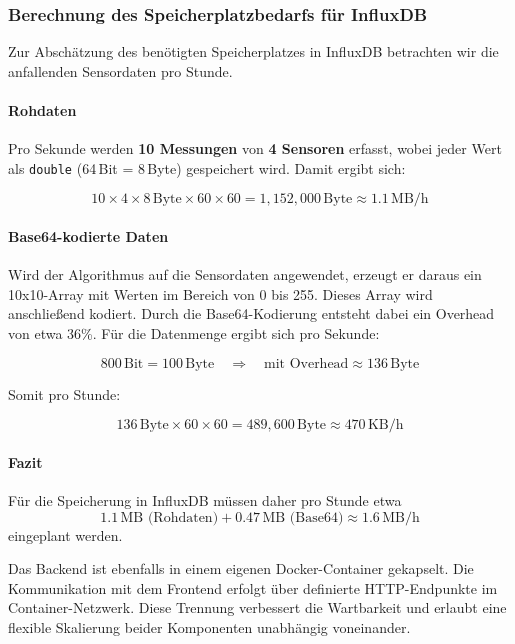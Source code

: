 \subsubsection*{Berechnung des Speicherplatzbedarfs für InfluxDB}

Zur Abschätzung des benötigten Speicherplatzes in InfluxDB betrachten wir die anfallenden Sensordaten pro Stunde.  

\paragraph{Rohdaten}  
Pro Sekunde werden \textbf{10 Messungen} von \textbf{4 Sensoren} erfasst, wobei jeder Wert als \texttt{double} (64\,Bit = 8\,Byte) gespeichert wird.  
Damit ergibt sich:  

\[
10 \times 4 \times 8 \,\text{Byte} \times 60 \times 60 
= 1{,}152{,}000 \,\text{Byte} \approx 1.1 \,\text{MB/h}
\]

\paragraph{Base64-kodierte Daten}  
Wird der Algorithmus auf die Sensordaten angewendet, erzeugt er daraus ein 10x10-Array mit Werten im Bereich von 0 bis 255. Dieses Array wird anschließend kodiert. Durch die Base64-Kodierung entsteht dabei ein Overhead von etwa 36\%. Für die Datenmenge ergibt sich pro Sekunde:  

\[
800 \,\text{Bit} = 100 \,\text{Byte} \quad \Rightarrow \quad 
\text{mit Overhead} \approx 136 \,\text{Byte}
\]

Somit pro Stunde:  

\[
136 \,\text{Byte} \times 60 \times 60 
= 489{,}600 \,\text{Byte} \approx 470 \,\text{KB/h}
\]

\paragraph{Fazit}  
Für die Speicherung in InfluxDB müssen daher pro Stunde etwa  
\[
1.1\,\text{MB (Rohdaten)} + 0.47\,\text{MB (Base64)} \approx 1.6\,\text{MB/h}
\]  
eingeplant werden.


Das Backend ist ebenfalls in einem eigenen Docker-Container gekapselt. 
Die Kommunikation mit dem Frontend erfolgt über definierte HTTP-Endpunkte im Container-Netzwerk. 
Diese Trennung verbessert die Wartbarkeit und erlaubt eine flexible Skalierung beider Komponenten unabhängig voneinander.

